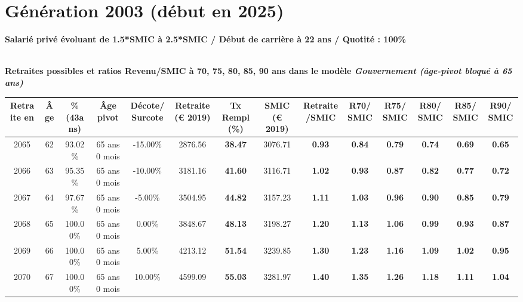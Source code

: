 \newpage 
 
\section{Génération 2003 (début en 2025)\label{Ascendant1525_100_2003_22_0}} 
 
{\bf \noindent Salarié privé évoluant de 1.5*SMIC à 2.5*SMIC / Début de carrière à 22 ans / Quotité : 100\%}  ~ 

 ~\\{\bf \noindent Retraites possibles et ratios Revenu/SMIC à 70, 75, 80, 85, 90 ans dans le modèle \emph{Gouvernement (âge-pivot bloqué à 65 ans)}}  
 
\begin{adjustbox}{max width=\textwidth} 
\begin{tabular}[htb]{|c|c||c|c|c||c|c||c|c||c|c|c|c|c|} 
\hline 
 Retraite en &  Âge &  \%(43ans) &  Âge pivot &  Décote/Surcote &  Retraite (\euro{} 2019) &  Tx Rempl(\%) &  SMIC (\euro{} 2019) &  Retraite/SMIC &  R70/SMIC &  R75/SMIC &  R80/SMIC &  R85/SMIC &  R90/SMIC \\ 
\hline \hline 
 2065 &  62 &  93.02\% &  65 ans 0 mois &  -15.00\% &  2876.56 &  {\bf 38.47} &  3076.71 &  {\bf {\color{red} 0.93}} &  {\bf {\color{red} 0.84}} &  {\bf {\color{red} 0.79}} &  {\bf {\color{red} 0.74}} &  {\bf {\color{red} 0.69}} &  {\bf {\color{red} 0.65}} \\ 
\hline 
 2066 &  63 &  95.35\% &  65 ans 0 mois &  -10.00\% &  3181.16 &  {\bf 41.60} &  3116.71 &  {\bf 1.02} &  {\bf {\color{red} 0.93}} &  {\bf {\color{red} 0.87}} &  {\bf {\color{red} 0.82}} &  {\bf {\color{red} 0.77}} &  {\bf {\color{red} 0.72}} \\ 
\hline 
 2067 &  64 &  97.67\% &  65 ans 0 mois &  -5.00\% &  3504.95 &  {\bf 44.82} &  3157.23 &  {\bf 1.11} &  {\bf 1.03} &  {\bf {\color{red} 0.96}} &  {\bf {\color{red} 0.90}} &  {\bf {\color{red} 0.85}} &  {\bf {\color{red} 0.79}} \\ 
\hline 
 2068 &  65 &  100.00\% &  65 ans 0 mois &  0.00\% &  3848.67 &  {\bf 48.13} &  3198.27 &  {\bf 1.20} &  {\bf 1.13} &  {\bf 1.06} &  {\bf {\color{red} 0.99}} &  {\bf {\color{red} 0.93}} &  {\bf {\color{red} 0.87}} \\ 
\hline 
 2069 &  66 &  100.00\% &  65 ans 0 mois &  5.00\% &  4213.12 &  {\bf 51.54} &  3239.85 &  {\bf 1.30} &  {\bf 1.23} &  {\bf 1.16} &  {\bf 1.09} &  {\bf 1.02} &  {\bf {\color{red} 0.95}} \\ 
\hline 
 2070 &  67 &  100.00\% &  65 ans 0 mois &  10.00\% &  4599.09 &  {\bf 55.03} &  3281.97 &  {\bf 1.40} &  {\bf 1.35} &  {\bf 1.26} &  {\bf 1.18} &  {\bf 1.11} &  {\bf 1.04} \\ 
\hline 
\hline 
\end{tabular} 
\end{adjustbox} 
 
